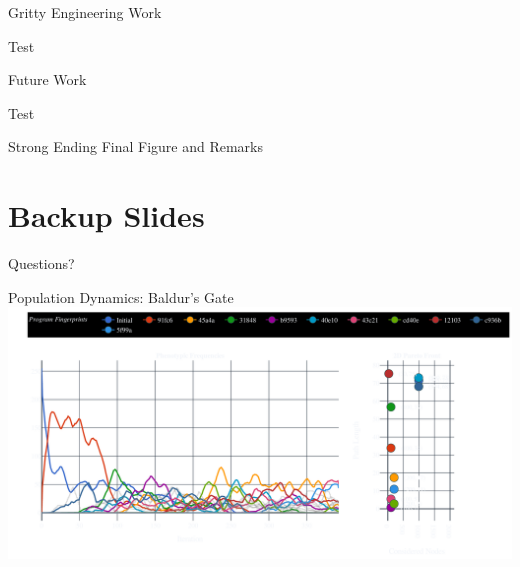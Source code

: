 \documentclass[aspectratio=169]{beamer}
\begin{document}
\begin{frame}{Gritty Engineering Work}
    \begin{vfilleditems}
    \item \Huge Test
    \end{vfilleditems}
\end{frame}

\begin{frame}{Future Work}
    \begin{vfilleditems}
    \item \Huge Test
    \end{vfilleditems}
\end{frame}

\begin{frame}{Strong Ending}
    \centering
    \vfill
    {\fontsize{40}{50}\selectfont Final Figure and Remarks}
    \vfill
\end{frame}

\appendix %
\section*{Backup Slides}

\begin{frame}
  \centering
  \vfill
  {\fontsize{40}{50}\selectfont Questions?}
  \vfill
\end{frame}


\begin{frame}
  \centering
  \printbibliography
\end{frame}

\begin{frame}{Population Dynamics: Baldur's Gate}
    \includegraphics[width=1.0\linewidth, keepaspectratio]{figures/baldurs_pheno_50.pdf}
\end{frame}
\end{document}
